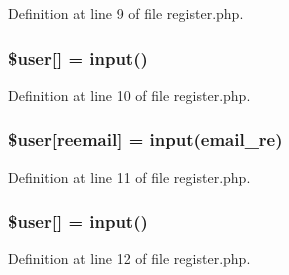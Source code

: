 Definition at line 9 of file register.\+php.

\subsubsection[{\texorpdfstring{\$user}{$user}}]{\setlength{\rightskip}{0pt plus 5cm}\${\bf user}\mbox{[}\textquotesingle{}\mbox{]} = {\bf input}(\textquotesingle{})}\hypertarget{register_8php_ae9de5cc5ae3fec81bb110d3a77ad7eec}{}\label{register_8php_ae9de5cc5ae3fec81bb110d3a77ad7eec}


Definition at line 10 of file register.\+php.

\subsubsection[{\texorpdfstring{\$user}{$user}}]{\setlength{\rightskip}{0pt plus 5cm}\${\bf user}\mbox{[}\textquotesingle{}reemail\textquotesingle{}\mbox{]} = {\bf input}(\textquotesingle{}email\+\_\+re\textquotesingle{})}\hypertarget{register_8php_a51e0459c93e600b4959a74463028a5e1}{}\label{register_8php_a51e0459c93e600b4959a74463028a5e1}


Definition at line 11 of file register.\+php.

\subsubsection[{\texorpdfstring{\$user}{$user}}]{\setlength{\rightskip}{0pt plus 5cm}\${\bf user}\mbox{[}\textquotesingle{}\mbox{]} = {\bf input}(\textquotesingle{})}\hypertarget{register_8php_a5afbe215d7a53599cd9f661abf8196e2}{}\label{register_8php_a5afbe215d7a53599cd9f661abf8196e2}


Definition at line 12 of file register.\+php.


